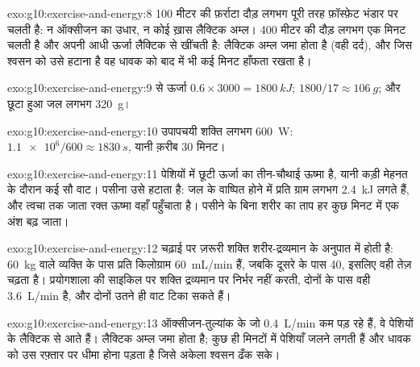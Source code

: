 \begin{solution}{exo:g10:exercise-and-energy:8}
100 मीटर की फ़र्राटा दौड़ लगभग पूरी तरह फ़ॉस्फ़ेट भंडार पर चलती है: न
ऑक्सीजन का उधार, न कोई ख़ास लैक्टिक अम्ल। 400 मीटर की दौड़ लगभग एक मिनट
चलती है और अपनी आधी ऊर्जा लैक्टिक  से खींचती है: लैक्टिक अम्ल जमा
होता है (वही दर्द), और जिस श्वसन को उसे हटाना है वह धावक को बाद में भी
कई मिनट हाँफता रखता है।
\end{solution}

\begin{solution}{exo:g10:exercise-and-energy:9}
 से ऊर्जा $0.6 \times 3000 = \qty{1800}{kJ}$; 
$1800/17 \approx \qty{106}{g}$; और छूटा हुआ जल लगभग \qty{320}{g}।
\end{solution}

\begin{solution}{exo:g10:exercise-and-energy:10}
उपापचयी शक्ति लगभग \qty{600}{W}: $\num{1.1e6}/600 \approx
\qty{1830}{s}$, यानी क़रीब 30 मिनट।
\end{solution}

\begin{solution}{exo:g10:exercise-and-energy:11}
पेशियों में छूटी ऊर्जा का तीन-चौथाई ऊष्मा है, यानी कड़ी मेहनत के दौरान
कई सौ वाट। पसीना उसे हटाता है: जल के वाष्पित होने में प्रति ग्राम लगभग
\qty{2.4}{kJ} लगते हैं, और त्वचा तक जाता रक्त ऊष्मा वहाँ पहुँचाता है।
पसीने के बिना शरीर का ताप हर कुछ मिनट में एक अंश बढ़ जाता।
\end{solution}

\begin{solution}{exo:g10:exercise-and-energy:12}
चढ़ाई पर ज़रूरी शक्ति शरीर-द्रव्यमान के अनुपात में होती है: \qty{60}{kg}
वाले व्यक्ति के पास प्रति किलोग्राम \qty{60}{mL/min} हैं, जबकि दूसरे के
पास \num{40}, इसलिए वही तेज़ चढ़ता है। प्रयोगशाला की साइकिल पर शक्ति
द्रव्यमान पर निर्भर नहीं करती, दोनों के पास वही \qty{3.6}{L/min} है, और
दोनों उतने ही वाट टिका सकते हैं।
\end{solution}

\begin{solution}{exo:g10:exercise-and-energy:13}
ऑक्सीजन-तुल्यांक के जो \qty{0.4}{L/min} कम पड़ रहे हैं, वे पेशियों के
लैक्टिक  से आते हैं। लैक्टिक अम्ल जमा होता है; कुछ ही मिनटों में
पेशियाँ जलने लगती हैं और धावक को उस रफ़्तार पर धीमा होना पड़ता है जिसे
अकेला श्वसन ढँक सके।
\end{solution}

